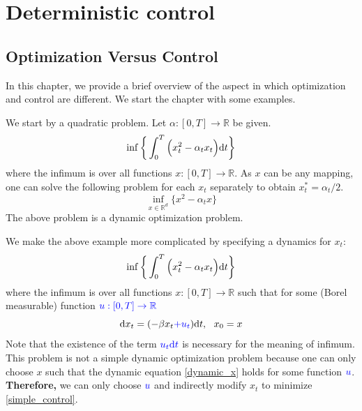 \documentclass[11pt]{book}
\newcommand{\dt}{\text{\normalfont d}t}
\newcommand{\dx}{\text{\normalfont d}x}
\begin{document}
\newpage
\setcounter{secnumdepth}{2}
\setcounter{page}{1}
\chapter{Deterministic control}
\label{chap:deterministic}
\section{Optimization Versus Control}
\label{sec:opt_control}
In this chapter, we provide a brief overview of the aspect in which optimization and control are different.  We start the chapter with some examples.
\begin{eg}\label{simple_optimization}
We start by a quadratic problem. Let $\alpha:[0,T]\to\mathbb{R}$ be given.
    \begin{equation}
        \inf\bigg\{\int_0^T\Big(x_t^2 - \alpha_t x_t\Big) {\dt}\bigg\}
    \end{equation}
where the infimum is over all functions $x:[0,T]\to\mathbb{R}$. As $x$ can be any mapping, one can solve the following problem for each $x_t$ separately to obtain $x^*_t=\alpha_t/2$.
    \begin{equation}
        \inf_{x\in\mathbb{R}^d}\bigg\{x^2 - \alpha_t x\bigg\}
    \end{equation}
The above problem is a dynamic optimization problem. 
\end{eg}
\begin{eg}
We make the above example more complicated by specifying a dynamics for $x_t$:
    \begin{equation}\label{simple_control}
        \inf\bigg\{\int_0^T\Big(x_t^2 - \alpha_t x_t\Big) {\dt}\bigg\}
    \end{equation}
where the infimum is over all functions $x:[0,T]\to\mathbb{R}$ such that for some (Borel measurable) function ${\color{blue} u:[0,T]\to\mathbb{R}}$
\begin{equation}\label{dynamic_x}
    {\dx}_t = (-\beta x_t  {\color{blue}+ u_t }) {\dt}, ~~ x_0=x
\end{equation}
Note that the existence of the term ${\color{blue} u_t {\dt}}$ is necessary for the meaning of infimum. This problem is not a simple dynamic optimization problem because one can only choose $x$ such that the dynamic equation \eqref{dynamic_x} holds for some function ${\color{blue} u}$. \textbf{Therefore,} we can only choose ${\color{blue} u}$ and indirectly modify $x_t$ to minimize \eqref{simple_control}.
\end{eg}
\end{document}
